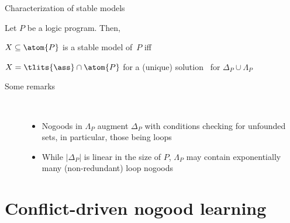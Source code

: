 \begin{frame}{Characterization of stable models}
\bigskip
\begin{theorem}
Let $P$ be a logic program. Then,

\qquad $X\subseteq\atom{P}$ is a stable model of~$P$ \alert{iff}

\qquad $X=\tlits{\ass}\cap\atom{P}$ for a (unique)
solution \ass\ for $\Delta_P\cup\Lambda_P$
\end{theorem}
\bigskip
\pause
\begin{description}
\item [Some remarks] \
\begin{itemize}
\item
Nogoods in $\Lambda_P$ augment $\Delta_P$
with conditions checking for \alert{unfounded sets},
in particular,
those being loops
\item
While $|\Delta_P|$ is linear in the size of $P$,
$\Lambda_P$ may contain \alert{exponentially many} (non-redundant) loop nogoods
\end{itemize}
\end{description}
\end{frame}
\section{Conflict-driven nogood learning}



